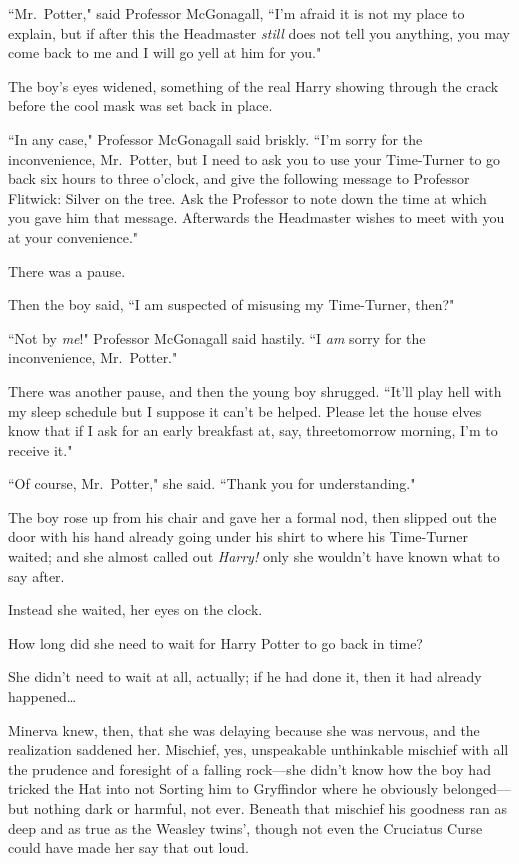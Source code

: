 ``Mr.~Potter," said Professor McGonagall, ``I'm afraid it is not my place to explain, but if after this the Headmaster \emph{still} does not tell you anything, you may come back to me and I will go yell at him for you."

The boy's eyes widened, something of the real Harry showing through the crack before the cool mask was set back in place.

``In any case," Professor McGonagall said briskly. ``I'm sorry for the inconvenience, Mr.~Potter, but I need to ask you to use your Time-Turner to go back six hours to three o'clock, and give the following message to Professor Flitwick: Silver on the tree. Ask the Professor to note down the time at which you gave him that message. Afterwards the Headmaster wishes to meet with you at your convenience."

There was a pause.

Then the boy said, ``I am suspected of misusing my Time-Turner, then?"

``Not by \emph{me}!" Professor McGonagall said hastily. ``I \emph{am} sorry for the inconvenience, Mr.~Potter."

There was another pause, and then the young boy shrugged. ``It'll play hell with my sleep schedule but I suppose it can't be helped. Please let the house elves know that if I ask for an early breakfast at, say, three\am tomorrow morning, I'm to receive it."

``Of course, Mr.~Potter," she said. ``Thank you for understanding."

The boy rose up from his chair and gave her a formal nod, then slipped out the door with his hand already going under his shirt to where his Time-Turner waited; and she almost called out \emph{Harry!} only she wouldn't have known what to say after.

Instead she waited, her eyes on the clock.

How long did she need to wait for Harry Potter to go back in time?

She didn't need to wait at all, actually; if he had done it, then it had already happened{\ldots}

Minerva knew, then, that she was delaying because she was nervous, and the realization saddened her. Mischief, yes, unspeakable unthinkable mischief with all the prudence and foresight of a falling rock—she didn't know how the boy had tricked the Hat into not Sorting him to Gryffindor where he obviously belonged—but nothing dark or harmful, not ever. Beneath that mischief his goodness ran as deep and as true as the Weasley twins', though not even the Cruciatus Curse could have made her say that out loud.


